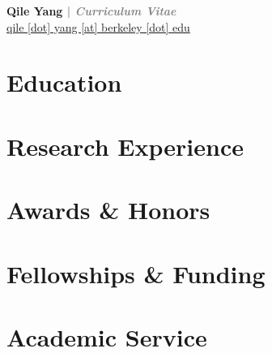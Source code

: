 \documentclass[11pt]{article}
\newcommand{\myinput}[1]{
  
}
\newcommand{\socialicon}[2]{
  \hypersetup{hidelinks}
  \href{https://#2}{\textcolor{cornflowerblue}{#1}}
}
\begin{document}

\begin{center}
  \Large\textbf{Qile Yang \textcolor{gray}{| \emph{Curriculum Vitae}}}\normalsize \\
  \href{mailto:qile.yang@berkeley.edu}{qile [dot] yang [at] berkeley [dot] edu} \\
  \socialicon{\faGlobe}{qile0317.github.io}
  \socialicon{\faLinkedin}{linkedin.com/in/qile0317}
  \socialicon{\faGithub}{github.com/Qile0317}
  \socialicon{\faGoogle}{scholar.google.com/citations?user=IsJeImQAAAAJ&hl=en}
  \socialicon{\faResearchgate}{www.researchgate.net/profile/Qile-Yang-2}
  \socialicon{\faOrcid}{orcid.org/my-orcid?orcid=0009-0005-0148-2499}
\end{center}

\RaggedRight

\section*{Education}
\myinput{education}

\section*{Research Experience}
\label{exp_research}
\myinput{exp_research}

\section*{Awards \& Honors}
\label{awards}
\myinput{awards}

\section*{Fellowships \& Funding}
\label{fellowships}
\myinput{fellowships}

\section*{Academic Service}
\label{service}
\myinput{Service}

\end{document}

